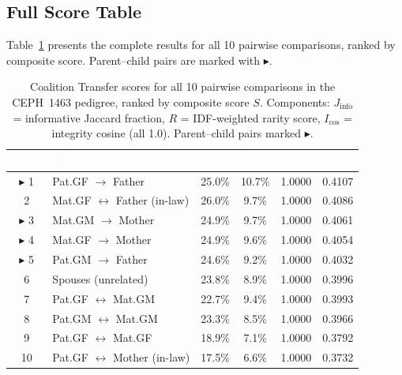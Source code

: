 \documentclass{../yalumba}
\begin{document}
\subsection{Full Score Table}
\label{sec:results-scores}

Table~\ref{tab:scores} presents the complete results for all 10 pairwise
comparisons, ranked by composite score.  Parent--child pairs are marked with
$\blacktriangleright$.

\begin{table}[htbp]
\centering
\tablestyle
\caption{Coalition Transfer scores for all 10 pairwise comparisons in the
CEPH~1463 pedigree, ranked by composite score $S$.  Components:
$J_\mathrm{info}$ = informative Jaccard fraction,
$R$ = IDF-weighted rarity score,
$I_{\mathrm{cos}}$ = integrity cosine (all 1.0).
Parent--child pairs marked $\blacktriangleright$.}
\label{tab:scores}
\begin{tabular}{clcccc}
\toprule
\rowcolor{table-header}
\textcolor{white}{\textbf{Rank}} &
\textcolor{white}{\textbf{Pair}} &
\textcolor{white}{\textbf{$J_\mathrm{info}$}} &
\textcolor{white}{\textbf{$R$}} &
\textcolor{white}{\textbf{$I_{\mathrm{cos}}$}} &
\textcolor{white}{\textbf{$S$}} \\
\midrule
$\blacktriangleright$ 1 & Pat.GF $\to$ Father     & 25.0\% & 10.7\% & 1.0000 & 0.4107 \\
2                       & Mat.GF $\leftrightarrow$ Father (in-law)  & 26.0\% & 9.7\% & 1.0000 & 0.4086 \\
$\blacktriangleright$ 3 & Mat.GM $\to$ Mother      & 24.9\% & 9.7\% & 1.0000 & 0.4061 \\
$\blacktriangleright$ 4 & Mat.GF $\to$ Mother      & 24.9\% & 9.6\% & 1.0000 & 0.4054 \\
$\blacktriangleright$ 5 & Pat.GM $\to$ Father      & 24.6\% & 9.2\% & 1.0000 & 0.4032 \\
6                       & Spouses (unrelated)       & 23.8\% & 8.9\% & 1.0000 & 0.3996 \\
7                       & Pat.GF $\leftrightarrow$ Mat.GM           & 22.7\% & 9.4\% & 1.0000 & 0.3993 \\
8                       & Pat.GM $\leftrightarrow$ Mat.GM           & 23.3\% & 8.5\% & 1.0000 & 0.3966 \\
9                       & Pat.GF $\leftrightarrow$ Mat.GF           & 18.9\% & 7.1\% & 1.0000 & 0.3792 \\
10                      & Pat.GF $\leftrightarrow$ Mother (in-law)  & 17.5\% & 6.6\% & 1.0000 & 0.3732 \\
\bottomrule
\end{tabular}
\end{table}
\end{document}
